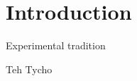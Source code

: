 \documentclass[english,print,aspectratio=169]{ifislide}
\author{Kjetil Kjernsmo}
\begin{document}
\IfiTitleSlide     %

\IfiTOCSlide       %


\section{Introduction} 

\begin{frame}{Experimental tradition}

Teh Tycho

\end{frame}
\end{document}
